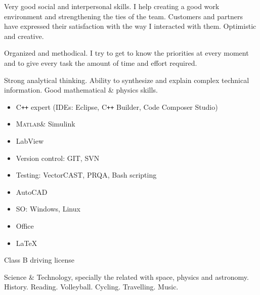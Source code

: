 \documentclass[helvetica,openbib,logo,notitle,flagCMYK,totpages, english]{europecv}
\newcommand{\MATLAB}{\textsc{Matlab}\xspace}
\begin{document}
\begin{europecv}






\ecvlanguageheader{(*)}
\ecvlanguagefooter[10pt]{(*)}

{
Very good social and interpersonal skills. 
I help creating a good work environment and strengthening the ties of the team. 
Customers and partners have expressed their satisfaction with the way I interacted with them.
Optimistic and creative.
}


{
Organized and methodical. I try to get to know the priorities at every moment and to give every task the amount of time and effort required.
}


{
Strong analytical thinking. 
Ability to synthesize and explain complex technical information. 
Good mathematical \& physics skills. 
}


{
\begin{itemize}
\item C\texttt{++} expert (IDEs: Eclipse, C\texttt{++} Builder, Code Composer Studio)
\item \MATLAB \& Simulink
\item LabView
\item Version control: GIT, SVN
\item Testing: VectorCAST, PRQA, Bash scripting
\item AutoCAD
\item SO: Windows, Linux
\item Office
\item \LaTeX
\end{itemize}
}

{
Class B driving license
}


{
Science \& Technology, specially the related with space, physics and astronomy. History. Reading. Volleyball. Cycling. Travelling. Music.
}


\end{europecv}
\end{document}
